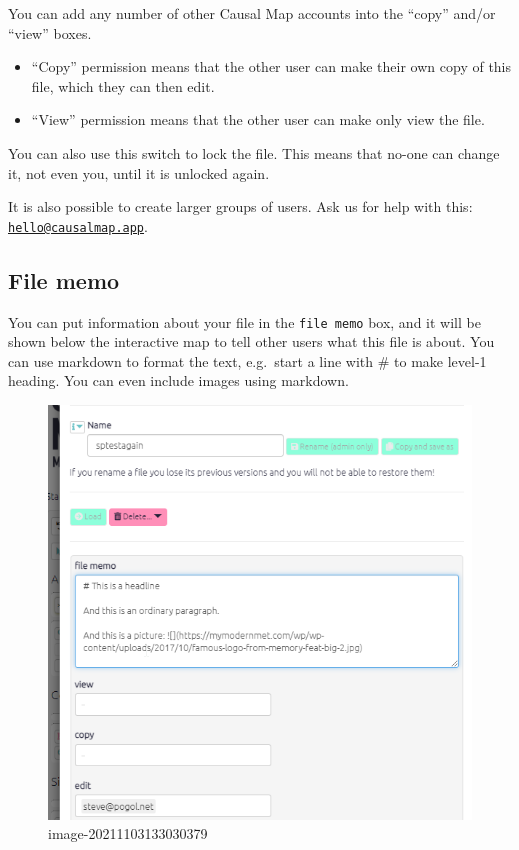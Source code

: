\documentclass[
]{book}
\begin{document}
You can add any number of other Causal Map accounts into the ``copy'' and/or ``view'' boxes.

\begin{itemize}
\item
  ``Copy'' permission means that the other user can make their own copy of this file, which they can then edit.
\item
  ``View'' permission means that the other user can make only view the file.
\end{itemize}

You can also use this switch to lock the file. This means that no-one can change it, not even you, until it is unlocked again.

It is also possible to create larger groups of users. Ask us for help with this: \href{mailto:hello@causalmap.app}{\nolinkurl{hello@causalmap.app}}.

\hypertarget{file-memo}{%
\subsection{File memo}\label{file-memo}}

You can put information about your file in the \texttt{file\ memo} box, and it will be shown below the interactive map to tell other users what this file is about. You can use markdown to format the text, e.g.~start a line with \# to make level-1 heading. You can even include images using markdown.

\begin{figure}
\centering
\includegraphics{_assets/image-20211103133030379.png}
\caption{image-20211103133030379}
\end{figure}
\end{document}
